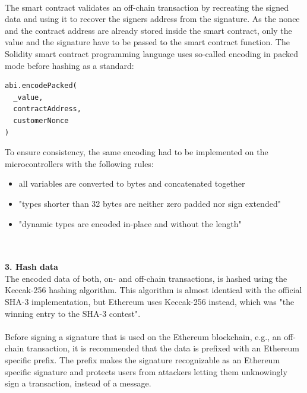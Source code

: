 \leavevmode
\\
The smart contract validates an off-chain transaction by recreating the signed data and using it to recover the signers address from the signature.
As the nonce and the contract address are already stored inside the smart contract, only the value and the signature have to be passed to the smart contract function.
The Solidity smart contract programming language uses so-called encoding in packed mode before hashing as a standard\cite{packed-spec}:
\\
\begin{lstlisting}[language=Solidity, numbers=none]
abi.encodePacked(
  _value,
  contractAddress,
  customerNonce
)
\end{lstlisting}
\leavevmode
\newpage
To ensure consistency, the same encoding had to be implemented on the microcontrollers with the following rules:
\begin{itemize}
  \item all variables are converted to bytes and concatenated together
  \item "types shorter than 32 bytes are neither zero padded nor sign extended"\cite{packed-spec}
  \item "dynamic types are encoded in-place and without the length"\cite{packed-spec}
\end{itemize}
\leavevmode
\\\\
\textbf{3. Hash data}\\
The encoded data of both, on- and off-chain transactions, is hashed using the Keccak-256 hashing algorithm.
This algorithm is almost identical with the official SHA-3 implementation, but Ethereum uses Keccak-256 instead, which was "the winning entry to the SHA-3 contest"\cite{ethereum-yellow-paper}.
\\\\
Before signing a signature that is used on the Ethereum blockchain, e.g., an off-chain transaction, it is recommended that the data is prefixed with an Ethereum specific prefix\cite{prefix}.
The prefix makes the signature recognizable as an Ethereum specific signature and protects users from attackers letting them unknowingly sign a transaction, instead of a message.

